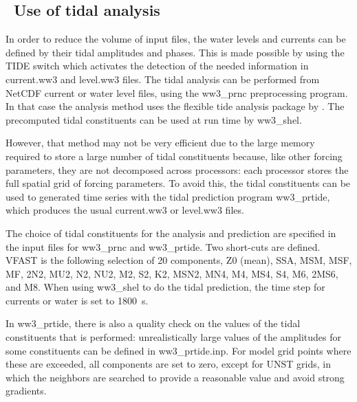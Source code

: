 \vssub
\subsection{~Use of tidal analysis} \label{sub:num_tide}

\noindent
In order to reduce the volume of input files, the water levels and currents
can be defined by their tidal amplitudes and phases. This is made possible by
using the {\code TIDE} switch which activates the detection of the needed
information in current.ww3 and level.ww3 files. The tidal analysis can be
performed from NetCDF current or water level files, using the {\file
  ww3\_prnc} preprocessing program. In that case the analysis method uses the
flexible tide analysis package by \cite{art:For09}. The precomputed tidal constituents 
can be used at run time by {\file ww3\_shel}.

However, that method may not be very efficient due to the large memory 
required to store a large number of tidal constituents because, like other 
forcing parameters, they are not decomposed across processors: each processor stores the full 
spatial grid of forcing parameters. To avoid this,  
the tidal constituents can be used to generated time series with the tidal
prediction program {\file ww3\_prtide}, which produces the usual {\file current.ww3} or 
{\file level.ww3} files.

The choice of tidal constituents for the analysis and prediction are specified
in the input files for {\file ww3\_prnc} and {\file ww3\_prtide}. Two
short-cuts are defined. {\code VFAST} is the following selection of 20
components, Z0 (mean), SSA, MSM, MSF, MF, 2N2, MU2, N2, NU2, M2, S2, K2, MSN2,
MN4, M4, MS4, S4, M6, 2MS6, and M8. When using {\code ww3\_shel} to do the
tidal prediction, the time step for currents or water is set to 1800~s.

In {\file ww3\_prtide}, there is also a quality check on the values of the
tidal constituents that is performed: unrealistically large values of the
amplitudes for some constituents can be defined in {\file ww3\_prtide.inp}.
For model grid points where these are exceeded, all components are set to
zero, except for UNST grids, in which the neighbors are searched to provide a
reasonable value and avoid strong gradients.
